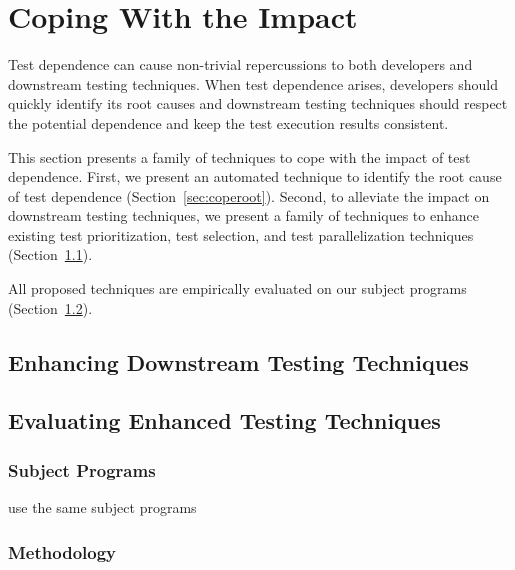 \section{Coping With the Impact}
\label{sec:cope}

Test dependence can cause non-trivial repercussions
to both developers and downstream testing techniques.
When test dependence arises, developers should quickly
identify its root causes and downstream testing techniques
should respect the potential dependence and keep the
test execution results consistent.

This section presents a family of techniques to cope with the
impact of test dependence. First, we present an automated
technique to identify the root cause of test dependence
(Section~\ref{sec:coperoot}). Second, to alleviate the
impact on downstream testing techniques, we present a family
of techniques to enhance existing test prioritization,
test selection, and test parallelization techniques (Section~\ref{sec:copeenhance}).

All proposed techniques are empirically evaluated on
our subject programs (Section~\ref{sec:evaluation}).


\subsection{Enhancing Downstream Testing Techniques}
\label{sec:copeenhance}




\subsection{Evaluating Enhanced Testing Techniques}
\label{sec:evaluation}

\subsubsection{Subject Programs}

use the same subject programs

\subsubsection{Methodology}


